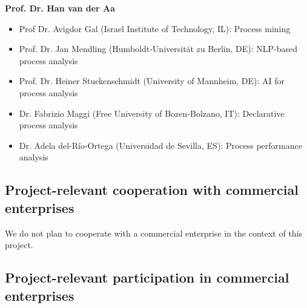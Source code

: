 \textbf{Prof. Dr. Han van der Aa}

\begin{itemize}
\item Prof Dr. Avigdor Gal (Israel Institute of Technology, IL): Process mining
\item Prof. Dr. Jan Mendling (Humboldt-Universit\"at zu Berlin, DE): NLP-based process analysis 
\item Prof. Dr. Heiner Stuckenschmidt (University of Mannheim, DE): AI for process analysis
\item Dr. Fabrizio Maggi (Free University of Bozen-Bolzano, IT): Declarative process analysis
\item Dr. Adela del-R\'{i}o-Ortega (Universidad de Sevilla, ES): Process performance analysis
\end{itemize}


\subsection{Project-relevant cooperation with commercial enterprises}

We do not plan to cooperate with a commercial enterprise in the context of this project. 


\subsection{Project-relevant participation in commercial enterprises}

